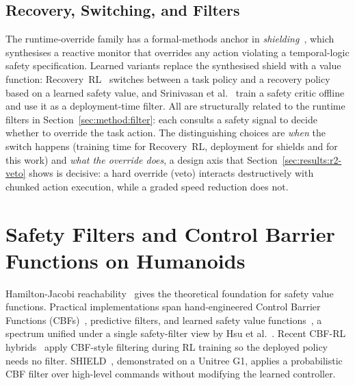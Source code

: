 \documentclass[11pt,a4paper]{report}
\begin{document}
\subsection{Recovery, Switching, and Filters}
\label{sec:bg:safe:recovery}

The runtime-override family has a formal-methods anchor in
\emph{shielding}~\cite{alshiekh2018shielding},
which synthesises a
reactive monitor that overrides any action violating a temporal-logic
safety specification. Learned variants replace the synthesised shield
with a value function: Recovery~RL~\cite{thananjeyan2021recovery}
switches between a task policy and a recovery policy based on a
learned safety value, and Srinivasan et
al.~\cite{srinivasan2020learning} train a safety critic offline and
use it as a deployment-time filter. All are structurally related to
the runtime filters in Section~\ref{sec:method:filter}: each consults
a safety signal to decide whether to override the task action. The
distinguishing choices are \emph{when} the switch happens (training
time for Recovery~RL, deployment for shields and for this work) and
\emph{what the override does}, a design axis that
Section~\ref{sec:results:r2-veto} shows is decisive: a hard override
(veto) interacts destructively with chunked action execution, while a
graded speed reduction does not.

\section{Safety Filters and Control Barrier Functions on Humanoids}
\label{sec:bg:cbf}

Hamilton-Jacobi reachability~\cite{bansal2017hamilton}
gives the theoretical foundation for safety value functions.
Practical implementations span hand-engineered Control Barrier
Functions (CBFs)~\cite{ames2019cbf}, predictive filters, and learned
safety value functions~\cite{srinivasan2020learning,thananjeyan2021recovery}, a
spectrum unified under a single safety-filter view by Hsu et
al.~\cite{hsu2024safetyfilter}.
Recent CBF-RL hybrids~\cite{cbfrl2024} apply CBF-style filtering
during RL training so the deployed policy needs no filter.
SHIELD~\cite{shield2025}, demonstrated on a Unitree G1, applies a
probabilistic CBF filter over high-level commands without modifying
the learned controller.
\end{document}
